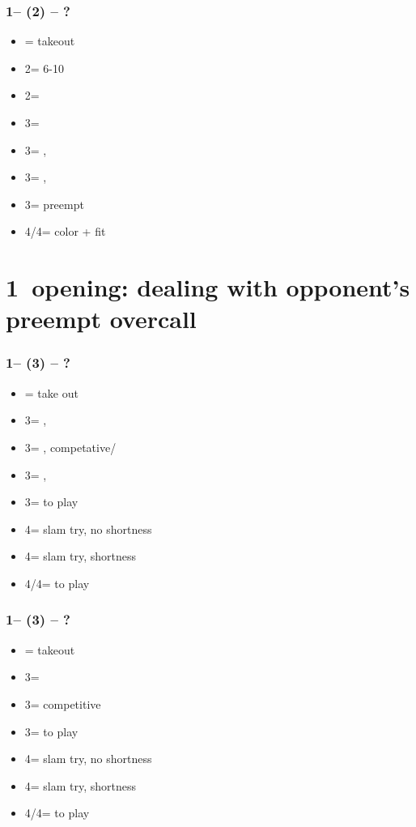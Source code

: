 \subsubsection*{1\spades -- (2\hearts) -- ?}
\begin{itemize}
    \item \dbl = takeout
    \item 2\spades = 6-10
    \item 2\nt = \clubs\ \invp
    \item 3\clubs = \diams\ \invp
    \item 3\diams = \spades, \gf
    \item 3\hearts = \spades, \inv
    \item 3\spades = preempt
    \item 4\clubs/4\diams = color + fit
\end{itemize}

\section{\texorpdfstring{1\spades\ opening: dealing with opponent's preempt overcall}{oppsOvercallTfx1sPreempt}}\label{sec:oppsOvercallTfx1sPreempt}

\subsubsection*{1\spades -- (3\clubs) -- ?}
\begin{itemize}
    \item \dbl = take out
    \item 3\diams = \hearts, \invp
    \item 3\hearts = \spades, competative/\gf
    \item 3\spades = \spades, \inv
    \item 3\nt = to play
    \item 4\clubs = slam try, no \clubs shortness
    \item 4\diams = slam try, \clubs shortness
    \item 4\hearts/4\spades = to play
\end{itemize}

\subsubsection*{1\spades -- (3\diams) -- ?}
\begin{itemize}
    \item \dbl = takeout
    \item 3\hearts = \hearts\ \gf
    \item 3\spades = competitive
    \item 3\nt = to play
    \item 4\clubs = slam try, no \diams shortness
    \item 4\diams = slam try, \diams shortness
    \item 4\hearts/4\spades = to play
\end{itemize}

